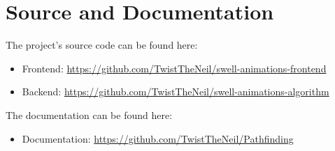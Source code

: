 \section{Source and Documentation} \label{App:AppendixSD}
The project's source code can be found here:\\
\begin{itemize}
    \item Frontend: \url{https://github.com/TwistTheNeil/swell-animations-frontend}
    \item Backend: \url{https://github.com/TwistTheNeil/swell-animations-algorithm}
\end{itemize}
The documentation can be found here:\\
\begin{itemize}
    \item Documentation: \url{https://github.com/TwistTheNeil/Pathfinding}
\end{itemize}
